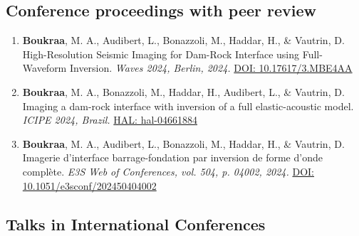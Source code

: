\documentclass[10pt]{article} %
\begin{document}
\subsection{Conference proceedings with peer review}
\begin{enumerate}
  \item \textbf{Boukraa}, M. A., Audibert, L., Bonazzoli, M., Haddar, H., \& Vautrin, D.  
  High-Resolution Seismic Imaging for Dam-Rock Interface using Full-Waveform Inversion.  
  \textit{Waves 2024, Berlin, 2024.}  
  \href{https://doi.org/10.17617/3.MBE4AA}{DOI: 10.17617/3.MBE4AA}

  \item \textbf{Boukraa}, M. A., Bonazzoli, M., Haddar, H., Audibert, L., \& Vautrin, D.  
  Imaging a dam-rock interface with inversion of a full elastic-acoustic model.  
  \textit{ICIPE 2024, Brazil.}  
  \href{https://uca.hal.science/hal-04661884}{HAL: hal-04661884}

  \item \textbf{Boukraa}, M. A., Audibert, L., Bonazzoli, M., Haddar, H., \& Vautrin, D.  
  Imagerie d’interface barrage-fondation par inversion de forme d’onde complète.  
  \textit{E3S Web of Conferences, vol. 504, p. 04002, 2024.}  
\href{https://doi.org/10.1051/e3sconf/202450404002}{DOI: \url{10.1051/e3sconf/202450404002}}
\end{enumerate}

\subsection{Talks in International Conferences}
\end{document}
